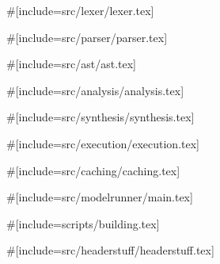 \newpage

#[include=src/lexer/lexer.tex]

\newpage

#[include=src/parser/parser.tex]

\newpage

#[include=src/ast/ast.tex]

\newpage

#[include=src/analysis/analysis.tex]

\newpage

#[include=src/synthesis/synthesis.tex]

\newpage

#[include=src/execution/execution.tex]

\newpage

#[include=src/caching/caching.tex]

\newpage

#[include=src/modelrunner/main.tex]

\appendix

\newpage

#[include=scripts/building.tex]

\newpage

#[include=src/headerstuff/headerstuff.tex]
